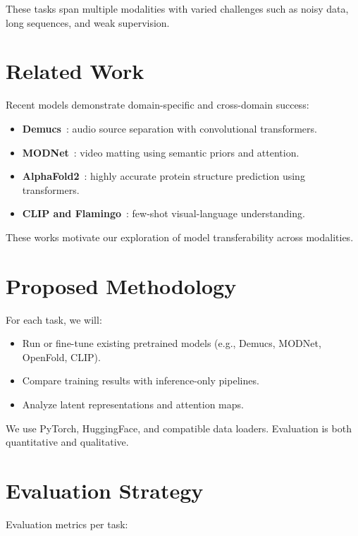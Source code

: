 \documentclass{article}
\begin{document}
These tasks span multiple modalities with varied challenges such as noisy data, long sequences, and weak supervision.

\section{Related Work}

Recent models demonstrate domain-specific and cross-domain success:

\begin{itemize}
    \item \textbf{Demucs}~\cite{defossez2021demucs}: audio source separation with convolutional transformers.
    \item \textbf{MODNet}~\cite{ke2020modnet}: video matting using semantic priors and attention.
    \item \textbf{AlphaFold2}~\cite{jumper2021alphafold}: highly accurate protein structure prediction using transformers.
    \item \textbf{CLIP and Flamingo}~\cite{radford2021clip,alayrac2022flamingo}: few-shot visual-language understanding.
\end{itemize}

These works motivate our exploration of model transferability across modalities.

\section{Proposed Methodology}

For each task, we will:

\begin{itemize}
    \item Run or fine-tune existing pretrained models (e.g., Demucs, MODNet, OpenFold, CLIP).
    \item Compare training results with inference-only pipelines.
    \item Analyze latent representations and attention maps.
\end{itemize}

We use PyTorch, HuggingFace, and compatible data loaders. Evaluation is both quantitative and qualitative.

\section{Evaluation Strategy}

Evaluation metrics per task:
\end{document}
